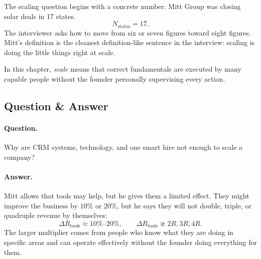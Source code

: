 The scaling question begins with a concrete number: Mitt Group was closing solar deals in 17 states.
\begin{equation}
N_{\text{states}}=17.
\end{equation}
The interviewer asks how to move from six or seven figures toward eight figures. Mitt's definition is the cleanest definition-like sentence in the interview: scaling is doing the little things right at scale.

\begin{definition}
In this chapter, \emph{scale} means that correct fundamentals are executed by many capable people without the founder personally supervising every action.
\end{definition}

\subsection{Question \& Answer}

\paragraph{Question.}
Why are CRM systems, technology, and one smart hire not enough to scale a company?

\paragraph{Answer.}
Mitt allows that tools may help, but he gives them a limited effect. They might improve the business by \(10\%\) or \(20\%\), but he says they will not double, triple, or quadruple revenue by themselves:
\begin{equation}
\Delta R_{\text{tools}}\approx 10\%\text{--}20\%,
\qquad
\Delta R_{\text{tools}}\not\approx 2R,3R,4R.
\end{equation}
The larger multiplier comes from people who know what they are doing in specific areas and can operate effectively without the founder doing everything for them.

